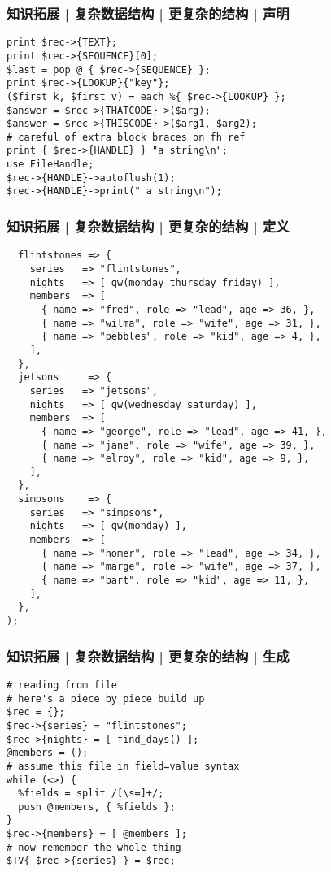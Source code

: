 \begin{frame}[fragile]
  \frametitle{知识拓展 | 复杂数据结构 | 更复杂的结构 | 声明}
\begin{lstlisting}
print $rec->{TEXT};
print $rec->{SEQUENCE}[0];
$last = pop @ { $rec->{SEQUENCE} };
print $rec->{LOOKUP}{"key"};
($first_k, $first_v) = each %{ $rec->{LOOKUP} };
$answer = $rec->{THATCODE}->($arg);
$answer = $rec->{THISCODE}->($arg1, $arg2);
# careful of extra block braces on fh ref
print { $rec->{HANDLE} } "a string\n";
use FileHandle;
$rec->{HANDLE}->autoflush(1);
$rec->{HANDLE}->print(" a string\n");
\end{lstlisting}
\end{frame}

\begin{frame}[fragile]
  \frametitle{知识拓展 | 复杂数据结构 | 更复杂的结构 | 定义}
\begin{lstlisting}[basicstyle=\footnotesize\tt]
%TV = (
  flintstones => {
    series   => "flintstones",
    nights   => [ qw(monday thursday friday) ],
    members  => [
      { name => "fred", role => "lead", age => 36, },
      { name => "wilma", role => "wife", age => 31, },
      { name => "pebbles", role => "kid", age => 4, },
    ],
  },
  jetsons     => {
    series   => "jetsons",
    nights   => [ qw(wednesday saturday) ],
    members  => [
      { name => "george", role => "lead", age => 41, },
      { name => "jane", role => "wife", age => 39, },
      { name => "elroy", role => "kid", age => 9, },
    ],
  },
  simpsons    => {
    series   => "simpsons",
    nights   => [ qw(monday) ],
    members  => [
      { name => "homer", role => "lead", age => 34, },
      { name => "marge", role => "wife", age => 37, },
      { name => "bart", role => "kid", age => 11, },
    ],
  },
);
\end{lstlisting}
\end{frame}

\begin{frame}[fragile]
  \frametitle{知识拓展 | 复杂数据结构 | 更复杂的结构 | 生成}
\begin{lstlisting}
# reading from file
# here's a piece by piece build up
$rec = {};
$rec->{series} = "flintstones";
$rec->{nights} = [ find_days() ];
@members = ();
# assume this file in field=value syntax
while (<>) {
  %fields = split /[\s=]+/;
  push @members, { %fields };
}
$rec->{members} = [ @members ];
# now remember the whole thing
$TV{ $rec->{series} } = $rec;
\end{lstlisting}
\end{frame}

